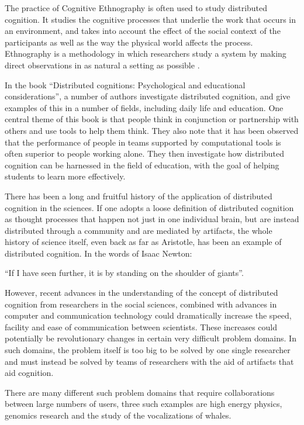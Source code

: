 \documentclass[12pt,oneside]{book}
\begin{document}
The practice of Cognitive Ethnography \cite{hollan00} is often used to
study distributed cognition.  It studies the cognitive processes that
underlie the work that occurs in an environment, and takes into account
the effect of the social context of the participants as well as the
way the physical world affects the process.  Ethnography is a
methodology in which researchers study a system by making direct
observations in as natural a setting as possible \cite{mcgrath95}.

In the book ``Distributed cognitions: Psychological and educational
considerations'', \cite{salomon97} a number of authors investigate
distributed cognition, and give examples of this in a number of
fields, including daily life and education.  One central theme of this
book is that people think in conjunction or partnership with others
and use tools to help them think.  They also note that it has been
observed that the performance of people in teams supported by
computational tools is often superior to people working alone.  They
then investigate how distributed cognition can be harnessed in the
field of education, with the goal of helping students to learn more
effectively.

There has been a long and fruitful history of the application of
distributed cognition in the sciences.  If one adopts a loose
definition of distributed cognition as thought processes that happen
not just in one individual brain, but are instead distributed through
a community and are mediated by artifacts, the whole history of
science itself, even back as far as Aristotle, has been an example of
distributed cognition.  In the words of Isaac Newton:

 ``If I have seen further, it is by standing on the shoulder of
giants''.

However, recent advances in the understanding of the concept of
distributed cognition from researchers in the social sciences,
combined with advances in computer and communication technology could
dramatically increase the speed, facility and ease of communication
between scientists.  These increases could potentially be
revolutionary changes in certain very difficult problem domains.  In
such domains, the problem itself is too big to be solved by one single
researcher and must instead be solved by teams of researchers with the
aid of artifacts that aid cognition.

There are many different such problem domains that require
collaborations between large numbers of users, three such examples are
high energy physics, genomics research and the study of the
vocalizations of whales.
\end{document}
